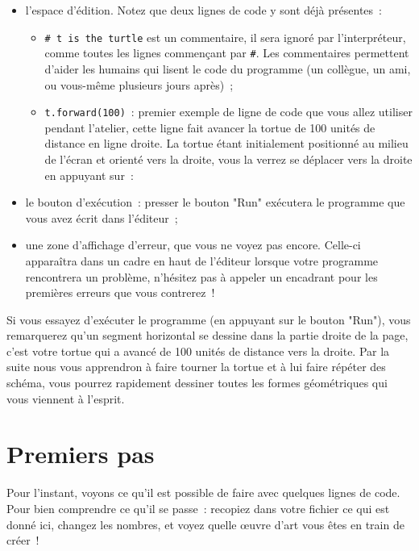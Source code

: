 \documentclass[11pt,a4paper]{article}
\begin{document}
\begin{itemize}
    \item l'espace d'édition. Notez que deux lignes de code y sont déjà
        présentes~:
        \begin{itemize}
            \item \lstinline{# t is the turtle} est un commentaire, il sera
                ignoré par l'interpréteur, comme toutes les lignes commençant
                par \lstinline{#}.  Les commentaires permettent d'aider les
                humains qui lisent le code du programme (un collègue, un ami, ou
                vous-même plusieurs jours après)~;
            \item \lstinline{t.forward(100)}~: premier exemple de ligne de code
                que vous allez utiliser pendant l'atelier, cette ligne fait
                avancer la tortue de 100 unités de distance en ligne droite. La
                tortue étant initialement positionné au milieu de l'écran et
                orienté vers la droite, vous la verrez se déplacer vers la
                droite en appuyant sur~:
        \end{itemize}
    \item le bouton d'exécution~: presser le bouton "Run" exécutera le programme
        que vous avez écrit dans l'éditeur~;
    \item une zone d'affichage d'erreur, que vous ne voyez pas encore. Celle-ci
        apparaîtra dans un cadre en haut de l'éditeur lorsque votre programme
        rencontrera un problème, n'hésitez pas à appeler un encadrant pour les
        premières erreurs que vous contrerez~!
\end{itemize}

Si vous essayez d'exécuter le programme (en appuyant sur le bouton "Run"),
vous remarquerez qu'un segment horizontal se dessine dans la partie droite de la
page, c'est votre tortue qui a avancé de 100 unités de distance vers la droite.
Par la suite nous vous apprendron à faire tourner la tortue et à lui faire
répéter des schéma, vous pourrez rapidement dessiner toutes les formes
géométriques qui vous viennent à l'esprit.

\newpage{}
\section{Premiers pas}

Pour l'instant, voyons ce qu'il est possible de faire avec quelques lignes de
code. Pour bien comprendre ce qu'il se passe~: recopiez dans votre fichier ce
qui est donné ici, changez les nombres, et voyez quelle œuvre d'art vous êtes en
train de créer~!
\end{document}
